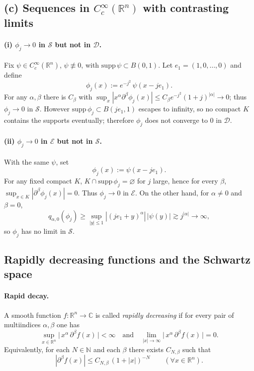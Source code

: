 \documentclass[12pt,a4paper]{article}
\theoremstyle{plain}
\theoremstyle{definition}
\theoremstyle{remark}
\theoremstyle{remark}
\begin{document}
\subsection*{(c) Sequences in $C_c^\infty(\mathbb R^n)$ with contrasting limits}

\paragraph{(i) $\phi_j\to0$ in $\mathcal S$ but not in $\mathcal D$.}
Fix $\psi\in C_c^\infty(\mathbb R^n)$, $\psi\not\equiv0$, with $\mathrm{supp}\,\psi\subset B(0,1)$.
Let $e_1=(1,0,\dots,0)$ and define
\[
\phi_j(x):=e^{-j^2}\,\psi(x-je_1).
\]
For any $\alpha,\beta$ there is $C_\beta$ with
$\sup_x |x^\alpha \partial^\beta \phi_j(x)| \le C_\beta e^{-j^2}(1+j)^{|\alpha|}\to0$; thus $\phi_j\to0$ in $\mathcal S$.
However $\mathrm{supp}\,\phi_j\subset B(je_1,1)$ escapes to infinity, so no compact $K$ contains the supports eventually; therefore $\phi_j$ does not converge to $0$ in $\mathcal D$.

\paragraph{(ii) $\phi_j\to0$ in $\mathcal E$ but not in $\mathcal S$.}
With the same $\psi$, set
\[
\phi_j(x):=\psi(x-je_1).
\]
For any fixed compact $K$, $K\cap\mathrm{supp}\,\phi_j=\varnothing$ for $j$ large, hence for every $\beta$,
$\sup_{x\in K}|\partial^\beta \phi_j(x)|=0$. Thus $\phi_j\to0$ in $\mathcal E$.
On the other hand, for $\alpha\neq0$ and $\beta=0$,
\[
q_{\alpha,0}(\phi_j)\ge \sup_{|y|\le 1}|(je_1+y)^\alpha|\,|\psi(y)| \gtrsim j^{|\alpha|}\to\infty,
\]
so $\phi_j$ has no limit in $\mathcal S$.


\subsection*{Rapidly decreasing functions and the Schwartz space}

\paragraph{Rapid decay.}
A smooth function $f:\mathbb{R}^n\to\mathbb{C}$ is called \emph{rapidly decreasing} if for every pair of multiindices $\alpha,\beta$ one has
\[
\sup_{x\in\mathbb{R}^n}\big|\,x^\alpha\,\partial^\beta f(x)\,\big|<\infty
\quad\text{and}\quad
\lim_{|x|\to\infty}\big|\,x^\alpha\,\partial^\beta f(x)\,\big|=0.
\]
Equivalently, for each $N\in\mathbb{N}$ and each $\beta$ there exists $C_{N,\beta}$ such that
\[
|\partial^\beta f(x)|\le C_{N,\beta}\,(1+|x|)^{-N}\qquad(\forall x\in\mathbb{R}^n).
\]
\end{document}
